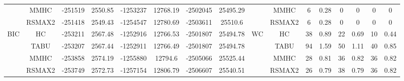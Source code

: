 \begin{table}[p]
{\begin{tabular}{cc||cc|cc|cc||cc|cc|cc|cc}
& MMHC &	-251519 & 	2550.85 & 	-1253237 & 	12768.19 & 	-2502045 & 	25495.29 & 	& MMHC &	6 & 	0.28 & 	0 & 	0 & 	0 & 	0\tabularnewline													
& RSMAX2 &	-251418 & 	2549.43 & 	-1254547 & 	12780.69 & 	-2503611 & 	25510.6 & 	& RSMAX2 &	6 & 	0.28 & 	0 & 	0 & 	0 & 	0\tabularnewline													
\hline																										
\multirow{4}{*}{BIC} & HC &	-253211 & 	2567.48 & 	-1252916 & 	12766.53 & 	-2501807 & 	25494.78 & 	\multirow{4}{*}{WC} & HC &	38 & 	0.89 & 	22 & 	0.69 & 	10 & 	0.44\tabularnewline													
& TABU &	-253207 & 	2567.44 & 	-1252911 & 	12766.49 & 	-2501807 & 	25494.78 & 	& TABU &	94 & 	1.59 & 	50 & 	1.11 & 	40 & 	0.85\tabularnewline													
& MMHC &	-253858 & 	2574.19 & 	-1255880 & 	12794.6 & 	-2505066 & 	25525.44 & 	& MMHC &	28 & 	0.81 & 	36 & 	0.82 & 	36 & 	0.82\tabularnewline													
& RSMAX2 &	-253749 & 	2572.73 & 	-1257154 & 	12806.79 & 	-2506607 & 	25540.51 & 	& RSMAX2 &	26 & 	0.79 & 	38 & 	0.79 & 	36 & 	0.82\tabularnewline													
\hline																										
\end{tabular}																										
}																										
\end{table}																										
